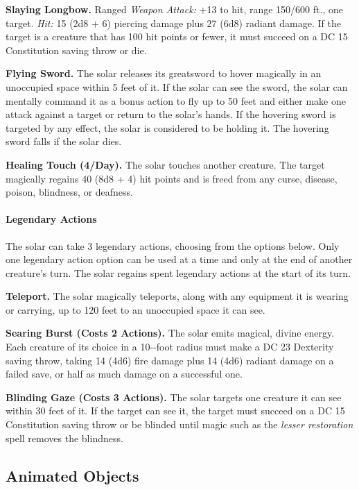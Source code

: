 \documentclass[
]{article}
\begin{document}
\textbf{Slaying Longbow.} Ranged \emph{Weapon Attack:} +13 to hit, range
150/600 ft., one target. \emph{Hit:} 15 (2d8 + 6) piercing damage plus
27 (6d8) radiant damage. If the target is a creature that has 100 hit
points or fewer, it must succeed on a DC 15 Constitution saving throw or
die.

\textbf{Flying Sword.} The solar releases its greatsword to hover
magically in an unoccupied space within 5 feet of it. If the solar can
see the sword, the solar can mentally command it as a bonus action to
fly up to 50 feet and either make one attack against a target or return
to the solar's hands. If the hovering sword is targeted by any effect,
the solar is considered to be holding it. The hovering sword falls if
the solar dies.

\textbf{Healing Touch (4/Day).} The solar touches another creature. The
target magically regains 40 (8d8 + 4) hit points and is freed from any
curse, disease, poison, blindness, or deafness.

\hypertarget{legendary-actions-1}{%
\paragraph{Legendary Actions}\label{legendary-actions-1}}

The solar can take 3 legendary actions, choosing from the options below.
Only one legendary action option can be used at a time and only at the
end of another creature's turn. The solar regains spent legendary
actions at the start of its turn.

\textbf{Teleport.} The solar magically teleports, along with any
equipment it is wearing or carrying, up to 120 feet to an unoccupied
space it can see.

\textbf{Searing Burst (Costs 2 Actions).} The solar emits magical,
divine energy. Each creature of its choice in a 10-­‐foot radius must
make a DC 23 Dexterity saving throw, taking 14 (4d6) fire damage plus 14
(4d6) radiant damage on a failed save, or half as much damage on a
successful one.

\textbf{Blinding Gaze (Costs 3 Actions).} The solar targets one creature
it can see within 30 feet of it. If the target can see it, the target
must succeed on a DC 15 Constitution saving throw or be blinded until
magic such as the \emph{lesser restoration} spell removes the blindness.

\hypertarget{animated-objects}{%
\subsection{Animated Objects}\label{animated-objects}}
\end{document}
